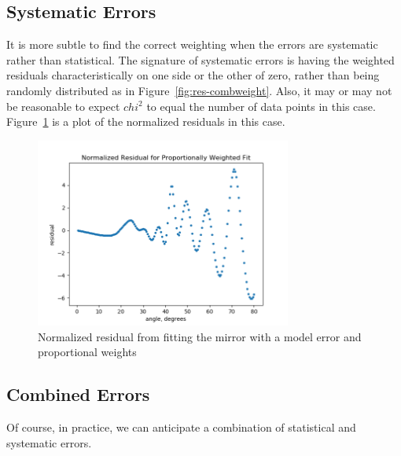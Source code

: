 \documentclass[english]{scrartcl}
\begin{document}
\subsection{Systematic Errors}
It is more subtle to find the correct weighting when
the errors are systematic rather than statistical. The
signature of systematic errors is having the weighted
residuals characteristically on one side or the other
of zero, rather than being randomly distributed as
in Figure~\ref{fig:res-combweight}. Also, it may or
may not be reasonable to expect $chi^2$ to equal the
number of data points in this case. Figure~\ref{fig:mrp} is
a plot of the normalized residuals in this case.
\begin{figure}[htb]
	\begin{center}
		\includegraphics[width=0.75\textwidth]{images/mrp}
	\end{center}
	\caption{\label{fig:mrp}Normalized residual from
	fitting the mirror with a model error and proportional
	weights}
\end{figure}

\subsection{Combined Errors}
Of course, in practice, we can anticipate a combination
of statistical and systematic errors.
\end{document}
